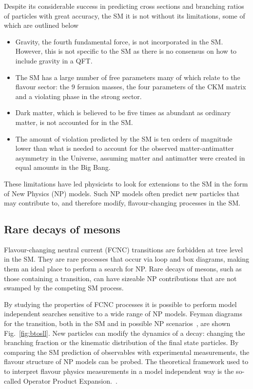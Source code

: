 Despite its considerable success in predicting cross sections and branching ratios of particles with great accuracy, the SM it is not without its limitations, some of which are outlined below

\begin{itemize}
  \item Gravity, the fourth fundamental force, is not incorporated in the SM. However, this is not specific to the SM as there is no consensus on how to include gravity in a QFT. 
  \item The SM has a large number of free parameters many of which relate to the flavour sector: the 9 fermion masses, the four parameters of the CKM matrix and a \CP violating phase in the strong sector.
  \item Dark matter, which is believed to be five times as abundant as ordinary matter, is not accounted for in the SM.
  \item The amount of \CP violation predicted by the SM is ten orders of magnitude lower than what is needed to account for the observed matter-antimatter asymmetry in the Universe, assuming matter and antimatter were created in equal amounts in the Big Bang.
\end{itemize}

\noindent These limitations have led physicists to look for extensions to the SM in the form of New Physics (NP) models. Such NP models often predict new particles that may contribute to, and therefore modify, flavour-changing processes in the SM.

\subsection{Rare decays of \B mesons}

Flavour-changing neutral current (FCNC) transitions are forbidden at tree level in the SM. They are rare processes that occur via loop and box diagrams, making them an ideal place to perform a search for NP. Rare decays of \B mesons, such as those containing a \btosll transition, can have sizeable NP contributions that are not swamped by the competing SM process. 

By studying the properties of FCNC processes it is possible to perform model independent searches sensitive to a wide range of NP models. Feyman diagrams for the \btosll transition, both in the SM and in possible NP scenarios~\cite{bstoll-higgs,bstoll-zprime}, are shown Fig.~\ref{fig:btosll}. New particles can modify the dynamics of a decay: changing the branching fraction or the kinematic distribution of the final state particles. By comparing the SM prediction of observables with experimental measurements, the flavour structure of NP models can be probed. The theoretical framework used to to interpret flavour physics measurements in a model independent way is the so-called Operator Product Expansion.~\cite{ope}.

